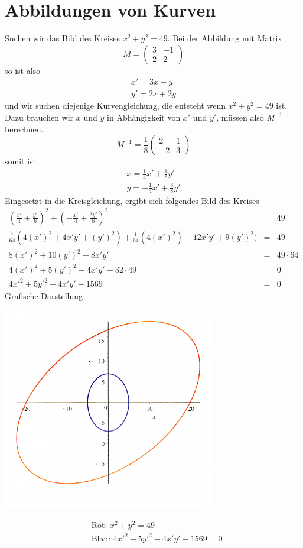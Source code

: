 \documentclass[a4paper,10pt]{report}
\begin{document}
\section{Abbildungen von Kurven}
Suchen wir das Bild des Kreises $x^2 + y^2 = 49$. Bei der Abbildung mit Matrix
\begin{equation*}
M = \begin{pmatrix}3 & -1 \\ 2 & 2\end{pmatrix}
\end{equation*}
so ist also
\begin{eqnarray*}
x' = 3x-y\\
y' = 2x+2y
\end{eqnarray*}
und wir suchen diejenige Kurvengleichung, die entsteht wenn $x^2 + y^2 = 49$ ist. Dazu brauchen wir $x$ und $y$ in Abhängigkeit von $x'$ und $y'$, müssen also $M^{-1}$ berechnen.
\begin{equation*}
M^{-1} = \frac{1}{8} \begin{pmatrix}2&1\\-2&3\end{pmatrix}
\end{equation*}
somit ist
\begin{eqnarray*}
x = \frac{1}{4}x' + \frac{1}{8} y'\\
y = -\frac{1}{4}x' + \frac{3}{8}y'
\end{eqnarray*}
Eingesetzt in die Kreisgleichung, ergibt sich folgendes Bild des Kreises
\begin{eqnarray*}
(\frac{x'}{4}+\frac{y'}{8})^2 + (-\frac{x'}{4}+\frac{3y'}{8})^2 &=& 49\\
\frac{1}{64}(4(x')^2 + 4x'y'+(y')^2) + \frac{1}{64}(4(x')^2)-12x'y'+9(y')^2) &=& 49\\
8(x')^2 + 10(y')^2-8x'y' &=& 49 \cdot 64\\
4(x')^2 + 5(y')^2 - 4x'y'-32\cdot 49 &=& 0\\
4x'^2 + 5y'^2 - 4x'y'-1569 &=& 0
\end{eqnarray*}
\newpage
Grafische Darstellung
\begin{center}
	 \includegraphics[width=0.7\textwidth]{imgs/AbbildungKreisgleichung.png}
\end{center}
\begin{eqnarray*}
&\text{Rot: }x^2 + y^2 = 49\\
&\text{Blau: }4x'^2 + 5y'^2 - 4x'y'-1569 = 0
\end{eqnarray*}
\newpage
\end{document}
